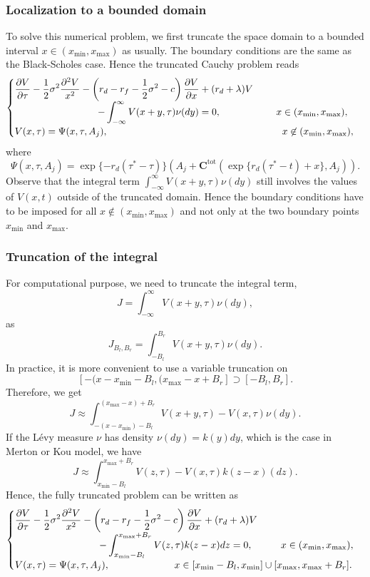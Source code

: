 \subsubsection{Localization to a bounded domain}
To solve this numerical problem, we first truncate the space domain to a bounded interval $x\in(x_{\min},x_{\max})$ as usually. The boundary conditions are the same as the Black-Scholes case. Hence the truncated Cauchy problem reads
$$\begin{cases}
\displaystyle{\frac{\partial V}{\partial \tau}-\frac{1}{2}\sigma^2\frac{\partial^2V}{x^2}-\left(r_d-r_f-\frac{1}{2}\sigma^2-c\right)\frac{\partial V}{\partial x}+(r_d+\lambda) V} \\
\hspace{3cm}\displaystyle{-\int_{-\infty}^\infty V(x+y,\tau)\nu(dy) = 0}, \hspace{2cm}x\in(x_{\min},x_{\max}),\\
V(x,\tau) = \Psi(x,\tau,A_j), \hspace{6.3cm} x \not\in (x_{\min},x_{\max}),
\end{cases}$$
where $$ \Psi(x,\tau,A_j) = \exp\{-r_d (\tau^\ast-\tau)\}\left(A_j + \mathbf{C}^\text{tot}(\exp\{r_d (\tau^\ast-t) + x\},A_j)\right).$$
Observe that the integral term $\int_{-\infty}^\infty V(x+y,\tau)\nu(dy)$ still involves the values of $V(x,t)$ outside of the truncated domain. Hence the boundary conditions have to be imposed for all $x\not\in(x_{\min},x_{\max})$ and not only at the two boundary points $x_{\min}$ and $x_{\max}$.

\subsubsection{Truncation of the integral}
For computational purpose, we need to truncate the integral term,
$$J = \int_{-\infty}^\infty V(x+y,\tau)\nu(dy),$$
as
$$J_{B_l,B_r} = \int_{-B_l}^{B_r} V(x+y,\tau)\nu(dy).$$
In practice, it is more convenient to use a variable truncation on $$[-(x-x_{\min}-B_l, (x_{\max}-x+B_r] \supset [-B_l,B_r].$$
Therefore, we get
$$J\approx \int_{-(x-x_{\min})-B_l}^{(x_{\max}-x)+B_r} V(x+y,\tau)-V(x,\tau)\nu(dy).$$
If the L\'evy measure $\nu$ has density $\nu(dy) = k(y) dy$, which is the case in Merton or Kou model, we have 
$$J\approx \int_{x_{\min}-B_l}^{x_{\max}+B_r} V(z,\tau)-V(x,\tau)k(z-x)(dz).$$
Hence, the fully truncated problem can be written as
$$\begin{cases}
\displaystyle{\frac{\partial V}{\partial \tau}-\frac{1}{2}\sigma^2\frac{\partial^2V}{x^2}-\left(r_d-r_f-\frac{1}{2}\sigma^2-c\right)\frac{\partial V}{\partial x}+(r_d + \lambda) V} \\
\hspace{3cm}\displaystyle{-\int_{x_{\min}-B_l}^{x_{\max}+B_r} V(z,\tau)k(z-x)dz = 0}, \hspace{1cm} x\in(x_{\min},x_{\max}),\\
V(x,\tau) = \Psi(x,\tau,A_j), \hspace{2.3cm} x \in [x_{\min}-B_l,x_{\min}]\cup[x_{\max},x_{\max}+B_r].
\end{cases}$$

